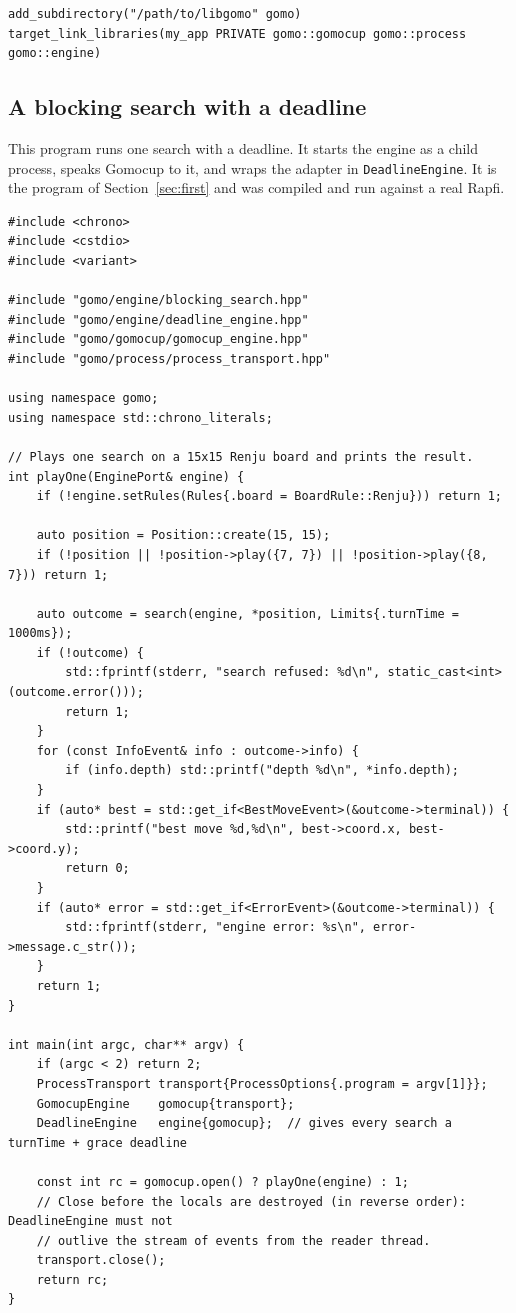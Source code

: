 \documentclass[11pt,a4paper]{article}
\newcommand{\code}[1]{\texttt{#1}}
\begin{document}
\begin{lstlisting}[style=sh]
add_subdirectory("/path/to/libgomo" gomo)
target_link_libraries(my_app PRIVATE gomo::gomocup gomo::process gomo::engine)
\end{lstlisting}

\subsection{A blocking search with a deadline}\label{sec:howto-search}

This program runs one search with a deadline. It starts the engine as a child process, speaks
Gomocup to it, and wraps the adapter in \code{DeadlineEngine}. It is the program of
Section~\ref{sec:first} and was compiled and run against a real Rapfi.

\begin{lstlisting}
#include <chrono>
#include <cstdio>
#include <variant>

#include "gomo/engine/blocking_search.hpp"
#include "gomo/engine/deadline_engine.hpp"
#include "gomo/gomocup/gomocup_engine.hpp"
#include "gomo/process/process_transport.hpp"

using namespace gomo;
using namespace std::chrono_literals;

// Plays one search on a 15x15 Renju board and prints the result.
int playOne(EnginePort& engine) {
    if (!engine.setRules(Rules{.board = BoardRule::Renju})) return 1;

    auto position = Position::create(15, 15);
    if (!position || !position->play({7, 7}) || !position->play({8, 7})) return 1;

    auto outcome = search(engine, *position, Limits{.turnTime = 1000ms});
    if (!outcome) {
        std::fprintf(stderr, "search refused: %d\n", static_cast<int>(outcome.error()));
        return 1;
    }
    for (const InfoEvent& info : outcome->info) {
        if (info.depth) std::printf("depth %d\n", *info.depth);
    }
    if (auto* best = std::get_if<BestMoveEvent>(&outcome->terminal)) {
        std::printf("best move %d,%d\n", best->coord.x, best->coord.y);
        return 0;
    }
    if (auto* error = std::get_if<ErrorEvent>(&outcome->terminal)) {
        std::fprintf(stderr, "engine error: %s\n", error->message.c_str());
    }
    return 1;
}

int main(int argc, char** argv) {
    if (argc < 2) return 2;
    ProcessTransport transport{ProcessOptions{.program = argv[1]}};
    GomocupEngine    gomocup{transport};
    DeadlineEngine   engine{gomocup};  // gives every search a turnTime + grace deadline

    const int rc = gomocup.open() ? playOne(engine) : 1;
    // Close before the locals are destroyed (in reverse order): DeadlineEngine must not
    // outlive the stream of events from the reader thread.
    transport.close();
    return rc;
}
\end{lstlisting}
\end{document}
